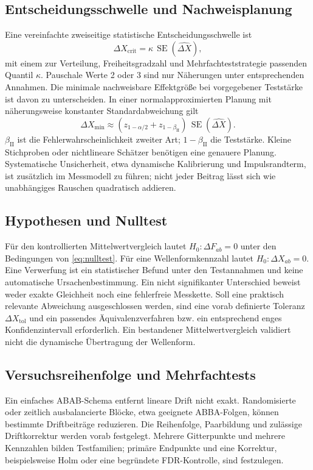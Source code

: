 \documentclass[11pt,a4paper]{article}
\newcommand{\SE}{\operatorname{SE}}
\begin{document}
\subsection{Entscheidungsschwelle und Nachweisplanung}\label{sec:schwelle}
Eine vereinfachte zweiseitige statistische Entscheidungsschwelle ist
\begin{equation}
\Delta X_{\mathrm{crit}}=\kappa\,\SE(\widehat{\Delta X}),
\label{eq:crit}
\end{equation}
mit einem zur Verteilung, Freiheitsgradzahl und Mehrfachteststrategie passenden Quantil $\kappa$. Pauschale Werte 2 oder 3 sind nur Näherungen unter entsprechenden Annahmen.
Die minimale nachweisbare Effektgröße bei vorgegebener Teststärke ist davon zu unterscheiden. In einer normalapproximierten Planung mit näherungsweise konstanter Standardabweichung gilt
\begin{equation}
\Delta X_{\min}\approx(z_{1-\alpha/2}+z_{1-\beta_{\mathrm{II}}})\,\SE(\widehat{\Delta X}).
\label{eq:power}
\end{equation}
$\beta_{\mathrm{II}}$ ist die Fehlerwahrscheinlichkeit zweiter Art; $1-\beta_{\mathrm{II}}$ die Teststärke. Kleine Stichproben oder nichtlineare Schätzer benötigen eine genauere Planung. Systematische Unsicherheit, etwa dynamische Kalibrierung und Impulsrandterm, ist zusätzlich im Messmodell zu führen; nicht jeder Beitrag lässt sich wie unabhängiges Rauschen quadratisch addieren.

\subsection{Hypothesen und Nulltest}
Für den kontrollierten Mittelwertvergleich lautet $H_0:\Delta F_{ab}=0$ unter den Bedingungen von \eqref{eq:nulltest}. Für eine Wellenformkennzahl lautet $H_0:\Delta X_{ab}=0$. Eine Verwerfung ist ein statistischer Befund unter den Testannahmen und keine automatische Ursachenbestimmung.
Ein nicht signifikanter Unterschied beweist weder exakte Gleichheit noch eine fehlerfreie Messkette. Soll eine praktisch relevante Abweichung ausgeschlossen werden, sind eine vorab definierte Toleranz $\Delta X_{\mathrm{tol}}$ und ein passendes Äquivalenzverfahren bzw. ein entsprechend enges Konfidenzintervall erforderlich. Ein bestandener Mittelwertvergleich validiert nicht die dynamische Übertragung der Wellenform.

\subsection{Versuchsreihenfolge und Mehrfachtests}
Ein einfaches ABAB-Schema entfernt lineare Drift nicht exakt. Randomisierte oder zeitlich ausbalancierte Blöcke, etwa geeignete ABBA-Folgen, können bestimmte Driftbeiträge reduzieren. Die Reihenfolge, Paarbildung und zulässige Driftkorrektur werden vorab festgelegt. Mehrere Gitterpunkte und mehrere Kennzahlen bilden Testfamilien; primäre Endpunkte und eine Korrektur, beispielsweise Holm oder eine begründete FDR-Kontrolle, sind festzulegen.
\end{document}
